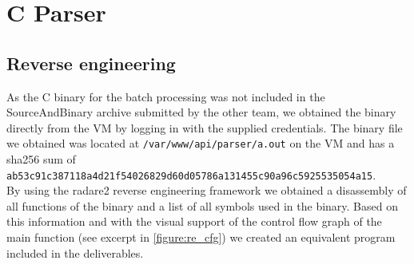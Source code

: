 \newpage
\section{C Parser}
\subsection{Reverse engineering} \label{chapter:re_rad}
As the C binary for the batch processing was not included in the
SourceAndBinary archive submitted by the other team, we obtained the binary
directly from the VM by logging in with the supplied credentials.
The binary file we obtained was located at \texttt{/var/www/api/parser/a.out}
on the VM and has a sha256 sum of
\texttt{ab53c91c387118a4d21f54026829d60d05786a131455c90a96c5925535054a15}. \\
By using the radare2 reverse engineering framework we obtained a disassembly of
all functions of the binary and a list of all symbols used in the binary.
Based on this information and with the visual support of the control flow graph
of the main function (see excerpt in \autoref{figure:re_cfg}) we created an
equivalent program included in the deliverables.

